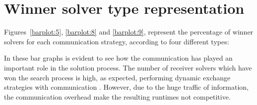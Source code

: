


\section{Winner solver type representation}

Figures~\ref{barplot:5}, \ref{barplot:8} and \ref{barplot:9}, represent the percentage of winner solvers for each communication strategy, according to four different types:


In these bar graphs is evident to see how the communication has played an important role in the solution process. The number of receiver solvers which have won the search process is high, as expected, performing dynamic exchange strategies with communication \oneTn. However, due to the huge traffic of information, the communication overhead make the resulting runtimes not competitive. 

